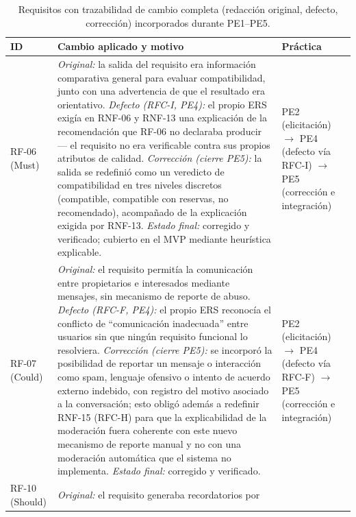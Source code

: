 \documentclass[journal,onecolumn]{IEEEtran}
\begin{document}
	\begin{table}[H]
		\centering
		\caption{Requisitos con trazabilidad de cambio completa (redacción original, defecto, corrección) incorporados durante PE1--PE5.}
		\label{tab:cambios-clave}
		\footnotesize
		\renewcommand{\arraystretch}{1.3}
		\begin{tabularx}{\textwidth}{
				|>{\raggedright\arraybackslash}p{1.1cm}
				|>{\raggedright\arraybackslash}X
				|>{\raggedright\arraybackslash}p{2.6cm}|}
			\hline
			\textbf{ID} & \textbf{Cambio aplicado y motivo} & \textbf{Práctica} \\
			\hline
			RF-06
			(Must) &
			\emph{Original:} la salida del requisito era información comparativa
			general para evaluar compatibilidad, junto con una advertencia de
			que el resultado era orientativo. \emph{Defecto (RFC-I, PE4):} el
			propio ERS exigía en RNF-06 y RNF-13 una explicación de la
			recomendación que RF-06 no declaraba producir --- el requisito no era
			verificable contra sus propios atributos de calidad. \emph{Corrección
				(cierre PE5):} la salida se redefinió como un veredicto de
			compatibilidad en tres niveles discretos (compatible, compatible con
			reservas, no recomendado), acompañado de la explicación exigida por
			RNF-13. \emph{Estado final:} corregido y verificado; cubierto en el
			MVP mediante heurística explicable. &
			PE2 (elicitación) $\rightarrow$ PE4 (defecto vía RFC-I) $\rightarrow$
			PE5 (corrección e integración) \\
			\hline
			RF-07
			(Could) &
			\emph{Original:} el requisito permitía la comunicación entre
			propietarios e interesados mediante mensajes, sin mecanismo de
			reporte de abuso. \emph{Defecto (RFC-F, PE4):} el propio ERS
			reconocía el conflicto de ``comunicación inadecuada'' entre usuarios
			sin que ningún requisito funcional lo resolviera. \emph{Corrección
				(cierre PE5):} se incorporó la posibilidad de reportar un mensaje o
			interacción como spam, lenguaje ofensivo o intento de acuerdo externo
			indebido, con registro del motivo asociado a la conversación; esto
			obligó además a redefinir RNF-15 (RFC-H) para que la explicabilidad
			de la moderación fuera coherente con este nuevo mecanismo de reporte
			manual y no con una moderación automática que el sistema no
			implementa. \emph{Estado final:} corregido y verificado. &
			PE2 (elicitación) $\rightarrow$ PE4 (defecto vía RFC-F) $\rightarrow$
			PE5 (corrección e integración) \\
			\hline
			RF-10
			(Should) &
			\emph{Original:} el requisito generaba recordatorios por

\end{tabularx}
\end{table}
\end{document}
